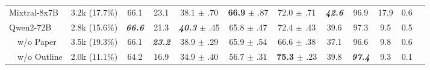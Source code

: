 \begin{table}[t]
{\begin{tabular}{lccccccccccc}
        Mixtral-8x7B
                              & 3.2k (17.7\%)
                              & 66.1
                              & 23.1
                              & 38.1 $\pm$ .70
                              & \textbf{66.9 }$\pm$ .87
                              & 72.0 $\pm$ .71
                              & \textbf{\itshape 42.6}
                              & 96.9
                              & 17.9
                              & 0.6
        \\
        Qwen2-72B
                              & 2.8k (15.6\%)
                              & \textbf{\itshape 66.6}
                              & 21.3
                              & \textbf{\itshape 40.3 }$\pm$ .45
                              & 65.8 $\pm$ .47
                              & 72.4 $\pm$ .43
                              & 39.6
                              & 97.3
                              & 9.5
                              & 0.5
        \\
        $\quad$w/o Paper
                              & 3.5k (19.3\%)
                              & 66.1
                              & \textbf{\itshape 23.2}
                              & 38.9 $\pm$ .29
                              & 65.9 $\pm$ .54
                              & 66.6 $\pm$ .38
                              & 37.1
                              & 96.6
                              & 9.8
                              & 0.6
        \\
        $\quad$w/o Outline
                              & 2.0k (11.1\%)
                              & 64.2
                              & 16.9
                              & 34.9 $\pm$ .40
                              & 56.7 $\pm$ .31
                              & \textbf{75.3 }$\pm$ .23
                              & 39.8
                              & \textbf{\textit{97.4}}
                              & 9.3
                              & 0.1
        \\
    

\end{tabular}}
\end{table}
